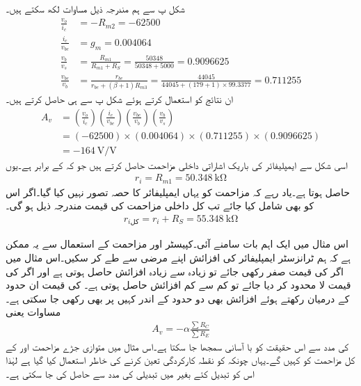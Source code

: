 شکل  پ سے ہم مندرجہ ذیل مساوات لکھ سکتے ہیں۔
\begin{align*}
\frac{v_o}{i_c}&=-R_{m2}=-62500\\
\frac{i_c}{v_{be}}&=g_m=0.004064 \\
\frac{v_b}{v_s}&=\frac{R_{m1}}{R_{m1}+R_S}=\frac{50348}{50348+5000}=0.9096625\\
\frac{v_{be}}{v_b}&=\frac{r_{be}}{r_{be}+(\beta+1)R_{m3}}=\frac{44045}{44045+(179+1) \times 99.3377}=0.711255
\end{align*}
ان نتائج کو استعمال کرتے ہوئے شکل  پ سے ہی  حاصل کرتے ہیں۔
\begin{align*}
A_v &=\left(\frac{v_o}{i_c} \right ) \left(\frac{i_c}{v_{be}} \right ) \left(\frac{v_{be}}{v_b} \right ) \left(\frac{v_b}{v_s} \right )\\
&=(-62500) \times (0.004064) \times (0.711255) \times (0.9096625)\\
&=\SI[per=frac,fraction=nice]{-164}{\volt \per \volt}
\end{align*}
اسی شکل سے ایمپلیفائر کی باریک اشاراتی داخلی مزاحمت حاصل کرتے ہیں جو کہ  کے برابر ہے۔یوں
\begin{align*}
r_i=R_{m1}=\SI{50.348}{\kilo \ohm}
\end{align*}
حاصل ہوتا ہے۔یاد رہے کہ مزاحمت  کو یہاں ایمپلیفائر کا حصہ تصور نہیں کیا گیا۔اگر اس کو بھی شامل کیا جائے تب کل داخلی مزاحمت کی قیمت مندرجہ ذیل ہو گی۔
\begin{align*}
r_{i\text{کل}}=r_i+R_S=\SI{55.348}{\kilo \ohm}
\end{align*}

اس مثال میں ایک اہم بات سامنے آئی۔کپیسٹر  اور مزاحمت  کے استعمال سے یہ ممکن ہے کہ ہم ٹرانزسٹر ایمپلیفائر کی افزائش اپنے مرضی سے طے کر سکیں۔اس مثال میں اگر  کی قیمت صفر رکھی جائے تو زیادہ سے زیادہ افزائش حاصل ہوتی ہے اور اگر   کی قیمت لا محدود کر دیا جائے تو کم سے کم افزائش حاصل ہوتی ہے۔  کی قیمت ان حدود کے درمیان رکھتے ہوئے افزائش بھی دو حدود کے اندر کہیں پر بھی رکھی جا سکتی ہے۔مساوات   یعنی
\begin{align*}
A_v= -\alpha \frac{\sum R_C}{\sum R_E}
\end{align*}
کی مدد سے اس حقیقت کو با آسانی سمجھا جا سکتا ہے۔اس مثال میں متوازی جڑے مزاحمت  اور  کے کل مزاحمت کو  کہیں گے۔یہاں چونکہ   کو نقطہ کارکردگی تعین کرنے کی خاطر استعمال کیا گیا ہے لہٰذا اس کو تبدیل کئے بغیر  میں تبدیلی  کی مدد سے حاصل کی جا سکتی ہے۔

